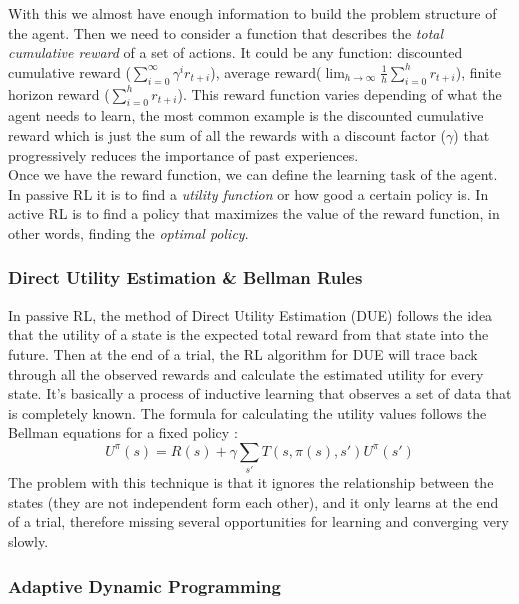 With this we almost have enough information to build the problem structure of the agent. Then we need to consider a function that describes the  \emph{total cumulative reward} of a set of actions. It could be any function: discounted cumulative reward ($\sum^{\infty}_{i=0}\gamma^ir_{t+i}$), average reward($\lim_{h\to\infty}\frac{1}{h}\sum^{h}_{i=0}r_{t+i}$), finite horizon reward ($\sum^{h}_{i=0}r_{t+i}$). This reward function varies depending of what the agent needs to learn, the most common example is the discounted cumulative reward which is just the sum of all the rewards with a discount factor ($\gamma$) that progressively reduces the importance of past experiences. \\


Once we have the reward function, we can define the learning task of the agent. In passive RL it is to find a \emph{utility function} or how good a certain policy is. In active RL is to find a policy that maximizes the value of the reward function, in other words, finding the \emph{optimal policy}.\cite{ml_tom_mitchel}\\



\subsubsection{Direct Utility Estimation \& Bellman Rules}

In passive RL, the method of Direct Utility Estimation (DUE) follows the idea that the utility of a state is the expected total reward from that state into the future. Then at the end of a trial, the RL algorithm for DUE will trace back through all the observed rewards and calculate the estimated utility for every state. It's basically a process of inductive learning that observes a set of data that is completely known. The formula for calculating the utility values follows the Bellman equations for a fixed policy \cite{rl}:\\


\begin{equation}
U^\pi(s) = R(s)+\gamma\sum_{s'}T(s,\pi(s),s') U^\pi(s')
\end{equation}
The problem with this technique is that it ignores the relationship between the states (they are not independent form each other), and it only learns at the end of a trial, therefore missing several opportunities for learning and converging very slowly\cite{rl}.

\subsubsection{Adaptive Dynamic Programming}

